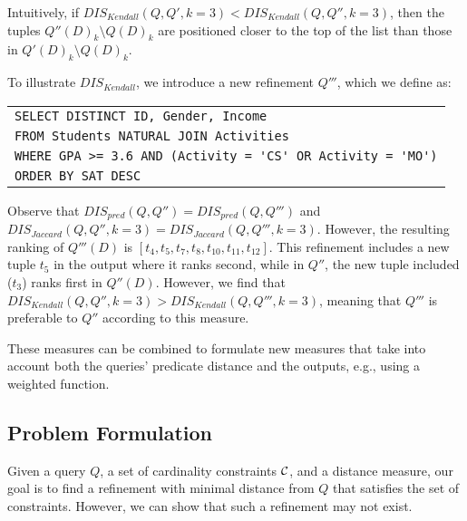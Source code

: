 Intuitively, if $DIS_{Kendall}(Q, Q',k=3) < DIS_{Kendall}(Q, Q'',k=3)$, then 
the tuples $Q''(D)_k \setminus Q(D)_k$
are positioned closer to the top of the list than those in $Q'(D)_k \setminus Q(D)_k$.
 
 

 \begin{example}
     To illustrate $DIS_{Kendall}$, we introduce a new refinement $Q'''$, which we define as:
     \begin{center}
     \footnotesize
     \begin{tabular}{l}
        \verb"SELECT DISTINCT ID, Gender, Income "\\
        \verb"FROM Students NATURAL JOIN Activities"\\
        \verb"WHERE GPA >= 3.6 AND (Activity = 'CS' OR Activity = 'MO')"\\
        \verb"ORDER BY SAT DESC "\\
     \end{tabular}
     \end{center}
     Observe that $DIS_{pred}(Q,Q'') = DIS_{pred}(Q,Q''')$ and $DIS_{Jaccard}(Q,Q'',k=3) = DIS_{Jaccard}(Q,Q''',k=3)$. 
     However, the resulting ranking of $Q'''(D)$ is $[t_4, t_5, t_7, t_8, t_{10}, t_{11}, t_{12}]$. This refinement includes a new tuple $t_5$ in the output where it ranks second, while in $Q''$, the new tuple included ($t_3$) ranks first in $Q''(D)$. However, we find that $DIS_{Kendall}(Q,Q'', k=3) > DIS_{Kendall}(Q,Q''',k=3)$,
     meaning that $Q'''$ is preferable to $Q''$ according to this measure. %
 \end{example}


    These measures can be combined to formulate new measures that take into account both the queries' predicate distance and the outputs, e.g., using a weighted function.  %


\subsection{Problem Formulation}
Given a query $Q$, a set of cardinality constraints $\mathcal{C}$, and a distance measure, our goal is to find a refinement with minimal distance from $Q$ that satisfies the set of constraints. However, we can show that such a refinement may not exist.





